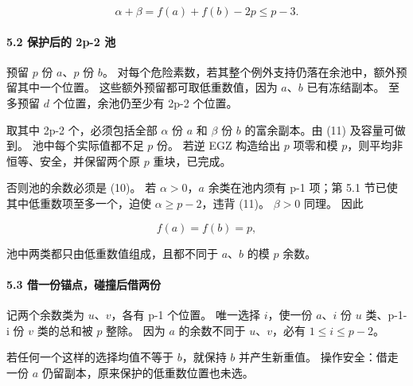 \[
\alpha+\beta=f(a)+f(b)-2p\le p-3.
\tag{C4.11}
\]

\paragraph*{\texorpdfstring{{5.2} {保护后的} {2p-2} {池}}{5.2 保护后的 2p-2 池}}\label{C4-h25}

{预留} {\ensuremath{p}} {份} {\ensuremath{a}、\ensuremath{p}} {份} {\ensuremath{b}。} {对每个危险素数，若其整个例外支持仍落在余池中，额外预留其中一个位置。} {这些额外预留都可取低重数值，因为} {\ensuremath{a}、\ensuremath{b}} {已有冻结副本。} {至多预留} {\ensuremath{d}} {个位置，余池仍至少有} {2p-2} {个位置。}

{取其中} {2p-2} {个，必须包括全部} {\ensuremath{\alpha }} {份} {\ensuremath{a}} {和} {\ensuremath{\beta }} {份} {\ensuremath{b}} {的富余副本。由} {(11)} {及容量可做到。} {池中每个实际值都不足} {\ensuremath{p}} {份。} {若逆} {EGZ} {构造给出} {\ensuremath{p}} {项零和模} {\ensuremath{p}，则平均非恒等、安全，并保留两个原} {\ensuremath{p}} {重块，已完成。}

{否则池的余数必须是} {(10)。} {若} {\ensuremath{\alpha >0}，\ensuremath{a}} {余类在池内须有} {p-1} {项；第} {5.1} {节已使其中低重数项至多一个，迫使} {\ensuremath{\alpha \ge p-2}，违背} {(11)。} {\ensuremath{\beta >0}} {同理。} {因此}

\[
f(a)=f(b)=p,
\]

{池中两类都只由低重数值组成，且都不同于} {\ensuremath{a}、\ensuremath{b}} {的模} {\ensuremath{p}} {余数。}

\paragraph*{\texorpdfstring{{5.3} {借一份锚点，碰撞后借两份}}{5.3 借一份锚点，碰撞后借两份}}\label{C4-h26}

{记两个余数类为} {\ensuremath{u}、\ensuremath{v}，各有} {p-1} {个位置。} {唯一选择} {\ensuremath{i}，使一份} {\ensuremath{a}、\ensuremath{i}} {份} {\ensuremath{u}} {类、p-1-i} {份} {\ensuremath{v}} {类的总和被} {\ensuremath{p}} {整除。} {因为} {\ensuremath{a}} {的余数不同于} {\ensuremath{u}、\ensuremath{v}，必有} {\ensuremath{1\le i\le p-2}。}

{若任何一个这样的选择均值不等于} {\ensuremath{b}，就保持} {\ensuremath{b}} {并产生新重值。} {操作安全：借走一份} {\ensuremath{a}} {仍留副本，原来保护的低重数位置也未选。}

